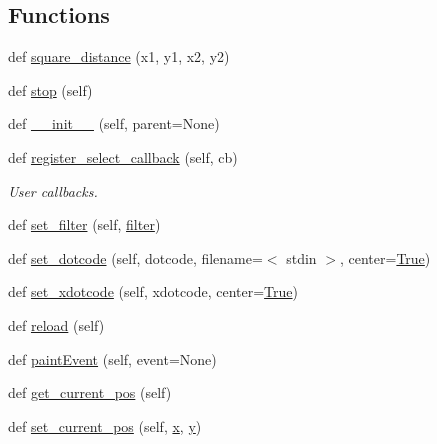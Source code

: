 \subsection*{Functions}
\begin{DoxyCompactItemize}
\item 
def \hyperlink{namespacesmacc__viewer_1_1xdot_1_1xdot__qt_a15a27993ec08c2d9f757df121bb482f8}{square\+\_\+distance} (x1, y1, x2, y2)
\item 
def \hyperlink{namespacesmacc__viewer_1_1xdot_1_1xdot__qt_adab66efefff94376fb4aa8911d1a0fa5}{stop} (self)
\item 
def \hyperlink{namespacesmacc__viewer_1_1xdot_1_1xdot__qt_a485164cd671e60eab21f82c07366882a}{\+\_\+\+\_\+init\+\_\+\+\_\+} (self, parent=None)
\item 
def \hyperlink{namespacesmacc__viewer_1_1xdot_1_1xdot__qt_acd21512da1a411b4d8cc9b95b6d07e63}{register\+\_\+select\+\_\+callback} (self, cb)
\begin{DoxyCompactList}\small\item\em User callbacks. \end{DoxyCompactList}\item 
def \hyperlink{namespacesmacc__viewer_1_1xdot_1_1xdot__qt_a46a4a42f59603b010d7f0c5a72d94ee1}{set\+\_\+filter} (self, \hyperlink{namespacesmacc__viewer_1_1xdot_1_1xdot__qt_a3e281a7b487568916dc614e2edd9f120}{filter})
\item 
def \hyperlink{namespacesmacc__viewer_1_1xdot_1_1xdot__qt_ace6bbb2ed7b95a7c61d788f42cf7fd8f}{set\+\_\+dotcode} (self, dotcode, filename=\textquotesingle{}$<$ stdin $>$\textquotesingle{}, center=\hyperlink{namespacesmacc__viewer_a48e3092f51d8fc570fcb3d6c76e27f3b}{True})
\item 
def \hyperlink{namespacesmacc__viewer_1_1xdot_1_1xdot__qt_a566dd0aa27ff6937e0ab91a6605c1389}{set\+\_\+xdotcode} (self, xdotcode, center=\hyperlink{namespacesmacc__viewer_a48e3092f51d8fc570fcb3d6c76e27f3b}{True})
\item 
def \hyperlink{namespacesmacc__viewer_1_1xdot_1_1xdot__qt_ab0f1f158626bd434a0b67806a7c91078}{reload} (self)
\item 
def \hyperlink{namespacesmacc__viewer_1_1xdot_1_1xdot__qt_a2fd6f9d0b11b7476944b3443126f9f55}{paint\+Event} (self, event=None)
\item 
def \hyperlink{namespacesmacc__viewer_1_1xdot_1_1xdot__qt_a6bf5ca14cdb165b80284afeba817cf6d}{get\+\_\+current\+\_\+pos} (self)
\item 
def \hyperlink{namespacesmacc__viewer_1_1xdot_1_1xdot__qt_a47f7205eac69dd34f4eb1fbf3c459952}{set\+\_\+current\+\_\+pos} (self, \hyperlink{namespacesmacc__viewer_1_1xdot_1_1xdot__qt_a1dd3d4e1f636ed9ebbed9b32d4c196df}{x}, \hyperlink{namespacesmacc__viewer_1_1xdot_1_1xdot__qt_a784c76c541d5dd5940e217a1aa54f256}{y})

\end{DoxyCompactItemize}
